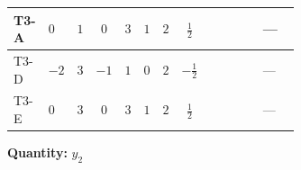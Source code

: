 \documentclass[8pt]{article}
\begin{document}
\begin{landscape}
\begin{longtable}{@{}llcccccc >{\raggedright\arraybackslash}p{0.21\linewidth} >{\raggedright\arraybackslash}p{0.21\linewidth} >{\raggedright\arraybackslash}p{0.21\linewidth}@{}}
\midrule
T3-A & $0$ & $1$ & $0$ & $3$ & $1$ & $2$ & $\frac{1}{2}$ & \scriptsize\adjustbox{max width=\linewidth}{$\begin{gathered} -\frac{9}{2} {g_2}^2 \left({y_2}\right)_{ij}\end{gathered}$} & \scriptsize\adjustbox{max width=\linewidth}{$\begin{gathered} -\frac{3}{2} {g_1}^2 \left({y_2}\right)_{ij}\end{gathered}$} & --- \\
\midrule
T3-D & $-2$ & $3$ & $-1$ & $1$ & $0$ & $2$ & $-\frac{1}{2}$ & \scriptsize\adjustbox{max width=\linewidth}{$\begin{gathered} -\frac{9}{2} {g_2}^2 \left({y_2}\right)_{ij}\end{gathered}$} & \scriptsize\adjustbox{max width=\linewidth}{$\begin{gathered} -\frac{3}{2} {g_1}^2 \left({y_2}\right)_{ij}\end{gathered}$} & --- \\
\midrule
T3-E & $0$ & $3$ & $0$ & $3$ & $1$ & $2$ & $\frac{1}{2}$ & \scriptsize\adjustbox{max width=\linewidth}{$\begin{gathered} -\frac{9}{2} {g_2}^2 \left({y_2}\right)_{ij}\end{gathered}$} & \scriptsize\adjustbox{max width=\linewidth}{$\begin{gathered} -\frac{3}{2} {g_1}^2 \left({y_2}\right)_{ij}\end{gathered}$} & --- \\
\midrule
\bottomrule
\end{longtable}
\clearpage
\noindent\textbf{Quantity: }$y_2$\par\smallskip

\end{landscape}
\end{document}

